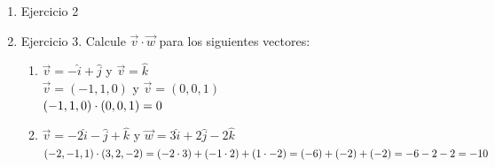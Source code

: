 \documentclass[10pt,letterpaper,fleqn]{article}
\begin{document}
\begin{enumerate}
        \item Ejercicio 2
        \item Ejercicio 3. Calcule $\overrightarrow{v} \cdot \overrightarrow{w}$
        para los siguientes vectores:
        \begin{enumerate}
          \item
          $\overrightarrow{v} = -\widehat{i}+\widehat{j}$ y
          $\overrightarrow{v} = \widehat{k}$ \\
            $\overrightarrow{v} = (-1,1,0)$ y
            $\overrightarrow{v} = (0,0,1)$ \\
            $
              (-1,1,0) \cdot (0,0,1) \\
              = 0
            $
            \\
          \item
          $\overrightarrow{v} = -2\widehat{i} -\widehat{j} + \widehat{k}$ y
          $\overrightarrow{w} = 3\widehat{i} + 2\widehat{j} -2\widehat{k}$
            $
              (-2,-1,1) \cdot (3,2,-2) \\
              = (-2\cdot 3) + (-1\cdot 2) + (1\cdot -2) \\
              = (-6) + (-2) + (-2) \\
              = - 6 - 2 - 2 \\
              = -10
            $
        \end{enumerate}


\end{enumerate}
\end{document}
